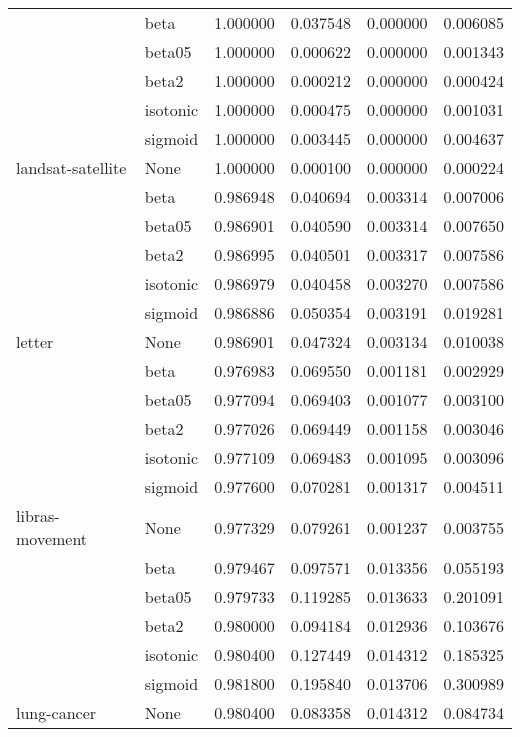 \begin{tabular}{llrrrr}
        & beta &  1.000000 &  0.037548 &  0.000000 &  0.006085 \\
        & beta05 &  1.000000 &  0.000622 &  0.000000 &  0.001343 \\
        & beta2 &  1.000000 &  0.000212 &  0.000000 &  0.000424 \\
        & isotonic &  1.000000 &  0.000475 &  0.000000 &  0.001031 \\
        & sigmoid &  1.000000 &  0.003445 &  0.000000 &  0.004637 \\
landsat-satellite & None &  1.000000 &  0.000100 &  0.000000 &  0.000224 \\
        & beta &  0.986948 &  0.040694 &  0.003314 &  0.007006 \\
        & beta05 &  0.986901 &  0.040590 &  0.003314 &  0.007650 \\
        & beta2 &  0.986995 &  0.040501 &  0.003317 &  0.007586 \\
        & isotonic &  0.986979 &  0.040458 &  0.003270 &  0.007586 \\
        & sigmoid &  0.986886 &  0.050354 &  0.003191 &  0.019281 \\
letter & None &  0.986901 &  0.047324 &  0.003134 &  0.010038 \\
        & beta &  0.976983 &  0.069550 &  0.001181 &  0.002929 \\
        & beta05 &  0.977094 &  0.069403 &  0.001077 &  0.003100 \\
        & beta2 &  0.977026 &  0.069449 &  0.001158 &  0.003046 \\
        & isotonic &  0.977109 &  0.069483 &  0.001095 &  0.003096 \\
        & sigmoid &  0.977600 &  0.070281 &  0.001317 &  0.004511 \\
libras-movement & None &  0.977329 &  0.079261 &  0.001237 &  0.003755 \\
        & beta &  0.979467 &  0.097571 &  0.013356 &  0.055193 \\
        & beta05 &  0.979733 &  0.119285 &  0.013633 &  0.201091 \\
        & beta2 &  0.980000 &  0.094184 &  0.012936 &  0.103676 \\
        & isotonic &  0.980400 &  0.127449 &  0.014312 &  0.185325 \\
        & sigmoid &  0.981800 &  0.195840 &  0.013706 &  0.300989 \\
lung-cancer & None &  0.980400 &  0.083358 &  0.014312 &  0.084734 \\

\end{tabular}
